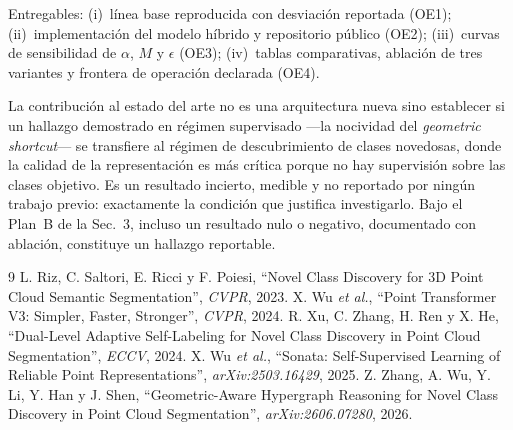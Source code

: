\documentclass[9pt,twocolumn,a4paper]{extarticle}
\begin{document}
Entregables: (i)~línea base reproducida con desviación reportada (OE1);
(ii)~implementación del modelo híbrido y repositorio público (OE2);
(iii)~curvas de sensibilidad de $\alpha$, $M$ y $\epsilon$ (OE3);
(iv)~tablas comparativas, ablación de tres variantes y frontera de operación
declarada (OE4).

La contribución al estado del arte no es una arquitectura nueva sino
establecer si un hallazgo demostrado en régimen supervisado ---la nocividad
del \emph{geometric shortcut}--- se transfiere al régimen de descubrimiento
de clases novedosas, donde la calidad de la representación es más crítica
porque no hay supervisión sobre las clases objetivo. Es un resultado
incierto, medible y no reportado por ningún trabajo previo: exactamente la
condición que justifica investigarlo. Bajo el Plan~B de la Sec.~3, incluso un
resultado nulo o negativo, documentado con ablación, constituye un hallazgo
reportable.

{\small
\begin{thebibliography}{9}
 L. Riz, C. Saltori, E. Ricci y F. Poiesi, ``Novel Class
Discovery for 3D Point Cloud Semantic Segmentation'', \emph{CVPR}, 2023.
 X. Wu \emph{et al.}, ``Point Transformer V3: Simpler, Faster,
Stronger'', \emph{CVPR}, 2024.
 R. Xu, C. Zhang, H. Ren y X. He, ``Dual-Level Adaptive
Self-Labeling for Novel Class Discovery in Point Cloud Segmentation'',
\emph{ECCV}, 2024.
 X. Wu \emph{et al.}, ``Sonata: Self-Supervised Learning of
Reliable Point Representations'', \emph{arXiv:2503.16429}, 2025.
 Z. Zhang, A. Wu, Y. Li, Y. Han y J. Shen,
``Geometric-Aware Hypergraph Reasoning for Novel Class Discovery in Point
Cloud Segmentation'', \emph{arXiv:2606.07280}, 2026.
\end{thebibliography}}
\end{document}
